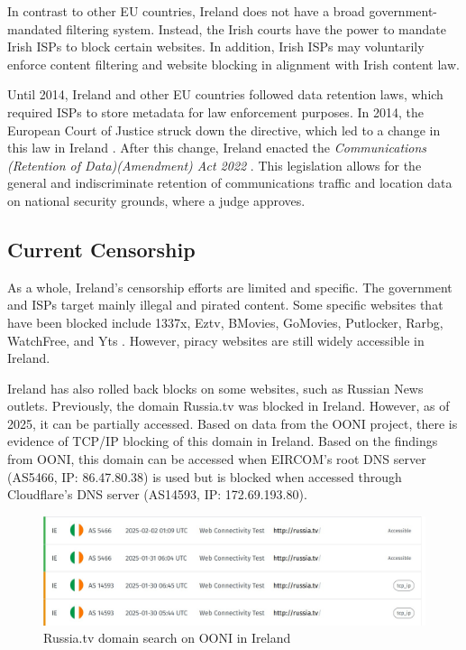 In contrast to other EU countries, Ireland does not have a broad government-mandated filtering system. Instead, the Irish courts have the power to mandate Irish ISPs to block certain websites. In addition, Irish ISPs may voluntarily enforce content filtering and website blocking in alignment with Irish content law.

Until 2014, Ireland and other EU countries followed data retention laws, which required ISPs to store metadata for law enforcement purposes. In 2014, the European Court of Justice struck down the directive, which led to a change in this law in Ireland \cite{DataRetentionInvalid2014}. After this change, Ireland enacted the \textit{Communications (Retention of Data)(Amendment) Act 2022} \cite{irishlegalDataRetention}. This legislation allows for the general and indiscriminate retention of communications traffic and location data on national security grounds, where a judge approves.

\subsection{Current Censorship}

As a whole, Ireland's censorship efforts are limited and specific. The government and ISPs target mainly illegal and pirated content. Some specific websites that have been blocked include 1337x, Eztv, BMovies, GoMovies, Putlocker, Rarbg, WatchFree, and Yts \cite{siliconrepublicMovieIndustry}. However, piracy websites are still widely accessible in Ireland.

Ireland has also rolled back blocks on some websites, such as Russian News outlets. Previously, the domain Russia.tv was blocked in Ireland. However, as of 2025, it can be partially accessed. Based on data from the OONI project, there is evidence of TCP/IP blocking of this domain in Ireland. Based on the findings from OONI, this domain can be accessed when EIRCOM's root DNS server (AS5466, IP: 86.47.80.38) is used but is blocked when accessed through Cloudflare's DNS server (AS14593, IP: 172.69.193.80).

\vspace{2em}

\begin{figure}[H]
    \centering
    \includegraphics[width=\textwidth]{Griff/TCD SCSS CAPSTONE/Literature Review/RussiaTV search OONI.jpg}
    \caption{Russia.tv domain search on OONI in Ireland}
    \label{fig:iraq-middlebox-HTTP-manipulation}
\end{figure}

